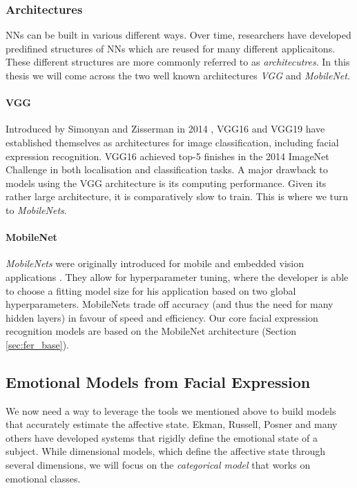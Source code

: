 \subsubsection{Architectures}
NNs can be built in various different ways. Over time, researchers have developed predifined structures of NNs which are reused for many different applicaitons. These different structures are more commonly referred to as \emph{architecutres}. In this thesis we will come across the two well known architectures \emph{VGG} and \emph{MobileNet}.
\paragraph{VGG}
Introduced by Simonyan and Zisserman in 2014 \cite{simonyan2015vgg}, VGG16 and VGG19 have established themselves as architectures for image classification, including facial expression recognition. VGG16 achieved top-5 finishes in the 2014 ImageNet Challenge in both localisation and classification tasks. A major drawback to models using the VGG architecture is its computing performance. Given its rather large architecture, it is comparatively slow to train. This is where we turn to \emph{MobileNets}.
\paragraph{MobileNet}
\label{sec:mobilenet}
\emph{MobileNets} were originally introduced for mobile and embedded vision applications \cite{howard2017mobilenets}. They allow for hyperparameter tuning, where the developer is able to choose a fitting model size for his application based on two global hyperparameters. MobileNets trade off accuracy (and thus the need for many hidden layers) in favour of speed and efficiency. Our core facial expression recognition models are based on the MobileNet architecture (Section \ref{sec:fer_base}).


\subsection{Emotional Models from Facial Expression}
\label{sub:rw_fer}
We now need a way to leverage the tools we mentioned above to build models that accurately estimate the affective state. Ekman, Russell, Posner and many others have developed systems that rigidly define the emotional state of a subject. While dimensional models, which define the affective state through several dimensions, we will focus on the \emph{categorical model} that works on emotional classes. 

